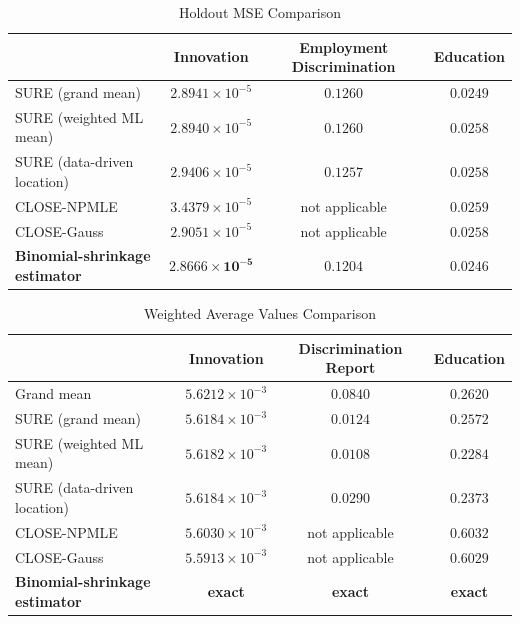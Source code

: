 \documentclass[12pt,letterpaper]{article}
\begin{document}
\begin{table}[htbp]
    \centering
    \caption{Holdout MSE Comparison}
    \label{tab:comparison:MSE}
    \begin{tabular}{l||c|c|c}
        \hline
        & Innovation & Employment Discrimination & Education \\
        \hline
        SURE (grand mean)
        &$2.8941\times10^{-5}$ & $0.1260$ & $0.0249$\\
        SURE (weighted ML mean) 
        &$2.8940\times10^{-5}$ & $0.1260$ & $0.0258$\\
        SURE (data-driven location) &$2.9406\times10^{-5}$ & $0.1257$ & $0.0258$\\
        CLOSE-NPMLE &$3.4379\times10^{-5}$  & not applicable & $0.0259$\\
        CLOSE-Gauss &$2.9051\times10^{-5}$  & not applicable &$0.0258$\\
        \textbf{Binomial-shrinkage estimator} 
        &$\mathbf{2.8666\times10^{-5}}$ & $\mathbf{0.1204}$ & $\mathbf{0.0246}$\\
        \hline
    \end{tabular}
\end{table}

\begin{table}[htbp]
    \centering
    \caption{Weighted Average Values Comparison}
    \label{tab:comparison:weighted:average}
    \begin{tabular}{l||c|c|c}
        \hline
        & Innovation & Discrimination Report & Education \\
        \hline
        Grand mean & $5.6212\times10^{-3}$ & $0.0840$ & $0.2620$ \\
        \hline
        SURE (grand mean)
        &$5.6184\times10^{-3}$ & $0.0124$ & $0.2572$\\
        SURE (weighted ML mean) 
        &$5.6182\times10^{-3}$ & $0.0108$ & $0.2284$\\
        SURE (data-driven location) & $5.6184\times10^{-3}$ & $0.0290$ & $0.2373$\\
        CLOSE-NPMLE & $5.6030\times10^{-3}$  & not applicable & $0.6032$\\
        CLOSE-Gauss & $5.5913\times10^{-3}$  & not applicable & $0.6029$\\
        \textbf{Binomial-shrinkage estimator} 
        & \textbf{exact} & \textbf{exact} & \textbf{exact}\\
        \hline
    \end{tabular}
\end{table}
\end{document}
